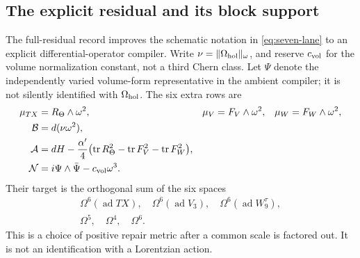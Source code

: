 \documentclass[11pt,a4paper]{article}
\newcommand{\ad}{\operatorname{ad}}
\begin{document}
\subsection{The explicit residual and its block support}

The full-residual record improves the schematic notation in
\eqref{eq:seven-lane} to an explicit differential-operator compiler. Write
\(\nu=\|\Omega_{\rm hol}\|_\omega\), and reserve \(c_{\rm vol}\) for the
volume normalization constant, not a third Chern class. Let \(\Psi\) denote
the independently varied volume-form representative in the ambient compiler;
it is not silently identified with \(\Omega_{\rm hol}\). The six extra rows are
\begin{align}
\mu_{TX}&=R_\Theta\wedge\omega^2,&
\mu_V&=F_V\wedge\omega^2,&
\mu_W&=F_W\wedge\omega^2,\nonumber\\
\mathcal B&=d(\nu\omega^2),\nonumber\\
\mathcal A&=dH-\frac{\alpha'}4
 \bigl(\operatorname{tr}R_\Theta^2-\operatorname{tr}F_V^2
                         -\operatorname{tr}F_W^2\bigr),\nonumber\\
\mathcal N&=i\Psi\wedge\bar\Psi-c_{\rm vol}\omega^3.
\label{eq:explicit-six-rows}
\end{align}
Their target is the orthogonal sum of the six spaces
\[
\begin{gathered}
\Omega^6(\ad TX),\quad\Omega^6(\ad V_3),\quad\Omega^6(\ad W_9^\tau),\\
\Omega^5,\quad\Omega^4,\quad\Omega^6 .
\end{gathered}
\]
This is a choice of positive repair metric after a common scale is
factored out. It is not an identification with a Lorentzian action.
\end{document}
